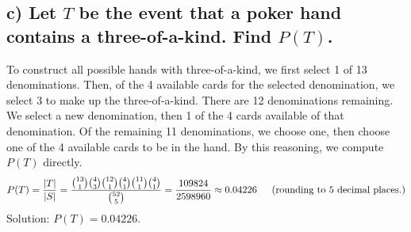 \documentclass[11pt, letterpaper]{article}
\begin{document}
\subsection*{c) \normalfont Let $T$ be the event that a poker hand contains a three-of-a-kind. Find $P(T)$.}
To construct all possible hands with three-of-a-kind, we first select 1 of 13 denominations. Then, of the 4 available
cards for the selected denomination, we select 3 to make up the three-of-a-kind. There are 12 denominations remaining.
We select a new denomination, then 1 of the 4 cards available of that denomination. Of the remaining 11 denominations, 
we choose one, then choose one of the 4 available cards to be in the hand. By this reasoning, we compute
$P(T)$ directly. 
\[P(T)=\frac{|T|}{|S|}=\frac{{13\choose 1}{4\choose 3}{12\choose 1}{4\choose 1}{11\choose 1}{4\choose 1}}{{52\choose 5}}=\frac{109824}{2598960}\approx 0.04226 \text{\indent (rounding to 5 decimal places.)}\]
Solution: $P(T)=0.04226$.
\end{document}
